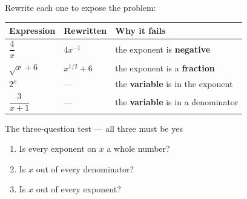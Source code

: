 \documentclass[aspectratio=169, 11pt]{beamer}
\begin{document}
\begin{frame}[t, plain]

  Rewrite each one to expose the problem:

  \medskip
  \begin{tabular}{|p{}|p{}|p{}|}
  \hline
  \textbf{Expression} & \textbf{Rewritten} & \textbf{Why it fails} \\
  \hline
  $\dfrac{4}{x}$ & $4x^{-1}$ & the exponent is \textbf{negative} \\
  \hline
  $\sqrt{x} + 6$ & $x^{1/2} + 6$ & the exponent is a \textbf{fraction} \\
  \hline
  $2^x$ & --- & the \textbf{variable} is in the exponent \\
  \hline
  $\dfrac{3}{x+1}$ & --- & the \textbf{variable} is in a denominator \\
  \hline
  \end{tabular}

  \bigskip
  \begin{block}{The three-question test --- all three must be yes}
    \begin{enumerate}\setlength{\itemsep}{3pt}
      \item Is every exponent on $x$ a whole number?
      \item Is $x$ out of every denominator?
      \item Is $x$ out of every exponent?
    \end{enumerate}
  \end{block}
\end{frame}
\end{document}
